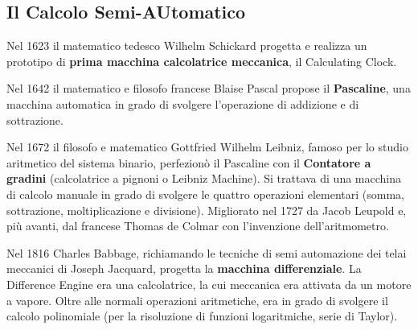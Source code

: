 \documentclass[12pt]{article} %
\begin{document}
\subsection{Il Calcolo Semi-AUtomatico}
Nel 1623 il matematico tedesco Wilhelm Schickard progetta e realizza un prototipo di \textbf{prima macchina calcolatrice meccanica}, il Calculating Clock.\par\medskip\noindent
Nel 1642 il matematico e filosofo francese Blaise Pascal propose il \textbf{Pascaline}, una macchina automatica in grado di svolgere l’operazione di addizione e di sottrazione.
\par\medskip\noindent
Nel 1672 il filosofo e matematico Gottfried Wilhelm Leibniz, famoso per lo studio aritmetico del sistema binario, perfezionò il Pascaline con il \textbf{Contatore a gradini} (calcolatrice a pignoni o Leibniz Machine). Si trattava di una macchina di calcolo manuale in grado di svolgere le quattro operazioni elementari (somma, sottrazione, moltiplicazione e divisione). Migliorato nel 1727 da Jacob Leupold e, più avanti, dal francese Thomas de Colmar con l’invenzione dell’aritmometro.
\par\medskip\noindent
Nel 1816 Charles Babbage, richiamando le tecniche di semi automazione dei telai meccanici di Joseph Jacquard, progetta la\textbf{ macchina differenziale}. La Difference Engine era una calcolatrice, la cui meccanica era attivata da un motore a vapore. Oltre alle normali operazioni aritmetiche, era in grado di svolgere il calcolo polinomiale (per la risoluzione di funzioni logaritmiche, serie di Taylor).
\end{document}
